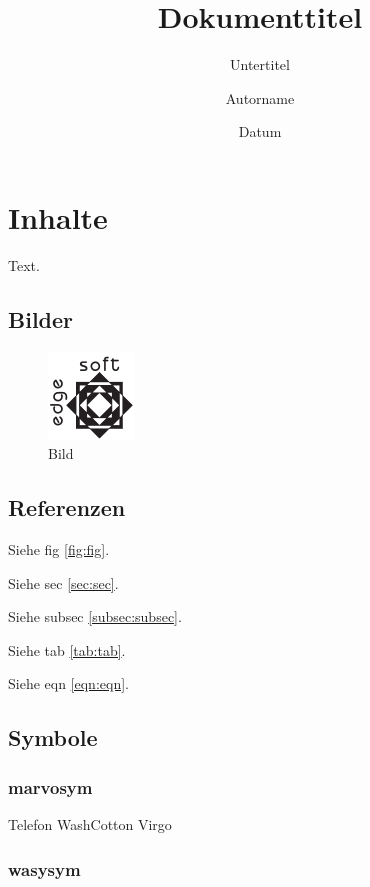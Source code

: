 \documentclass[ngerman]{scrartcl}
\title[Kurzform]{Dokumenttitel}
\subtitle{Untertitel}
\date{Datum}
\author{Autorname}
\begin{document}
	\maketitle

	\tableofcontents
	\cleardoublepage

	\section{Inhalte}
	\label{sec:sec}

	Text.

	\subsection{Bilder}
	\label{subsec:subsec}

	\begin{figure}[htb]
		\caption{Bild}
		\label{fig:fig}
		\includegraphics{testlogo}
	\end{figure}

	\subsection{Referenzen}

	Siehe fig \autoref{fig:fig}.

	Siehe sec \autoref{sec:sec}.

	Siehe subsec \autoref{subsec:subsec}.

	Siehe tab \autoref{tab:tab}.

	Siehe eqn \autoref{eqn:eqn}.

	\subsection{Symbole}

	\subsubsection{marvosym}

	Telefon \Telefon{}
	WashCotton \WashCotton{}
	Virgo \Virgo{}

	\subsubsection{wasysym}
\end{document}
